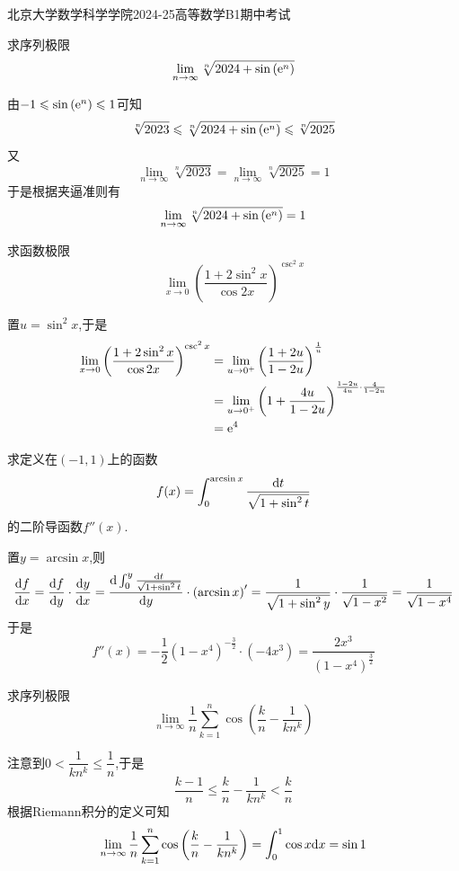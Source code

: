\documentclass{ctexart}
\begin{document}
\pagestyle{empty}
\begin{center}\Large
    北京大学数学科学学院2024-25高等数学B1期中考试
\end{center}
\begin{problem}[1.(10\songti{分})]
    求序列极限$$\lim_{n\to\infty}{\sqrt[n]{2024+\sin\left(\mathrm{e}^n\right)}}$$
\end{problem}
\begin{solution}
    由$-1\leqslant\sin\left(\mathrm{e}^n\right)\leqslant 1$可知
    $$\sqrt[n]{2023}\leqslant\sqrt[n]{2024+\sin\left(\mathrm{e}^n\right)}\leqslant\sqrt[n]{2025}$$
    又$$\lim_{n\to\infty}\sqrt[n]{2023}=\lim_{n\to\infty}\sqrt[n]{2025}=1$$
    于是根据夹逼准则有$$\lim_{n\to\infty}\sqrt[n]{2024+\sin\left(\mathrm{e}^n\right)}=1$$
\end{solution}
\begin{problem}[2.(10\songti{分})]
    求函数极限$$\lim_{x\to0}\left(\dfrac{1+2\sin^2x}{\cos2x}\right)^{\csc^2x}$$
\end{problem}
\begin{solution}
    置$u=\sin^2 x$,于是
    $$\begin{aligned}
        \lim_{x\to0}\left(\dfrac{1+2\sin^2x}{\cos2x}\right)^{\csc^2x}
        &= \lim_{u\to0^+}\left(\dfrac{1+2u}{1-2u}\right)^{\frac{1}{u}} \\
        &= \lim_{u\to0^+}\left(1+\dfrac{4u}{1-2u}\right)^{\frac{1-2u}{4u}\cdot\frac{4}{1-2u}} \\
        &= \mathrm{e}^4 
    \end{aligned}$$
\end{solution}
\begin{problem}[3.(10\songti{分})]
    求定义在$(-1,1)$上的函数$$f(x)=\int_0^{\arcsin x}\dfrac{\mathrm{d} t}{\sqrt{1+\sin^2t}}$$的二阶导函数$f''(x)$.
\end{problem}
\begin{solution}
    置$y=\arcsin{x}$,则
    $$\dfrac{\mathrm{d} f}{\mathrm{d} x}=\dfrac{\mathrm{d} f}{\mathrm{d} y}\cdot\dfrac{\mathrm{d} y}{\mathrm{d} x}
    =\dfrac{\mathrm{d}\int_{0}^{y}{\frac{\mathrm{d} t}{\sqrt{1+\sin^2t}}}}{\mathrm{d} y}\cdot\left(\arcsin x\right)'
    =\dfrac{1}{\sqrt{1+\sin^2y}}\cdot\dfrac{1}{\sqrt{1-x^2}}=\dfrac{1}{\sqrt{1-x^4}}$$
    于是$$f''(x)=-\dfrac{1}{2}\left(1-x^4\right)^{-\frac{3}{2}}\cdot(-4x^3)=\dfrac{2x^3}{\left(1-x^4\right)^{\frac{3}{2}}}$$
\end{solution}
\begin{problem}[4.(10\songti{分})]
    求序列极限$$\lim_{n\to\infty}\dfrac{1}{n}\sum_{k=1}^{n}\cos\left(\dfrac{k}{n}-\dfrac{1}{kn^k}\right)$$
\end{problem}
\begin{solution}
    注意到$0<\dfrac{1}{kn^k}\leqslant\dfrac{1}{n}$,于是
    $$\dfrac{k-1}{n}\leqslant\dfrac{k}{n}-\dfrac{1}{kn^k}<\dfrac{k}{n}$$
    根据Riemann积分的定义可知
    $$\lim_{n\to\infty}\dfrac{1}{n}\sum_{k=1}^{n}\cos\left(\dfrac{k}{n}-\dfrac{1}{kn^k}\right)=\int_0^1\cos x\mathrm{d} x=\sin 1$$
\end{solution}
\end{document}
